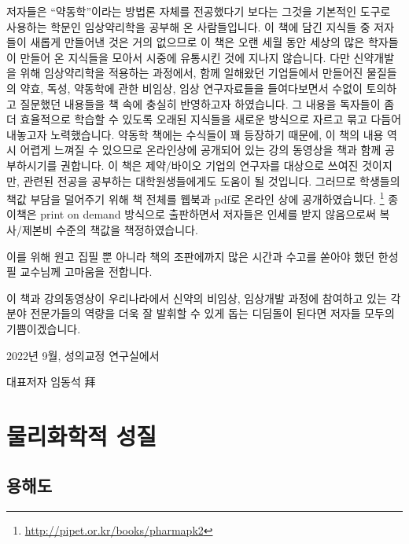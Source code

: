 \documentclass[
  11pt,
  krantz2, a4paper, twoside]{krantz}
\begin{document}
저자들은 ``약동학''이라는 방법론 자체를 전공했다기 보다는 그것을 기본적인
도구로 사용하는 학문인 임상약리학을 공부해 온 사람들입니다. 이 책에 담긴
지식들 중 저자들이 새롭게 만들어낸 것은 거의 없으므로 이 책은 오랜 세월
동안 세상의 많은 학자들이 만들어 온 지식들을 모아서 시중에 유통시킨 것에
지나지 않습니다. 다만 신약개발을 위해 임상약리학을 적용하는 과정에서,
함께 일해왔던 기업들에서 만들어진 물질들의 약효, 독성, 약동학에 관한
비임상, 임상 연구자료들을 들여다보면서 수없이 토의하고 질문했던 내용들을
책 속에 충실히 반영하고자 하였습니다. 그 내용을 독자들이 좀 더
효율적으로 학습할 수 있도록 오래된 지식들을 새로운 방식으로 자르고 묶고
다듬어 내놓고자 노력했습니다. 약동학 책에는 수식들이 꽤 등장하기 때문에, 이 책의 내용 역시 어렵게 느껴질 수 있으므로 온라인상에 공개되어 있는 강의 동영상을 책과 함께 공부하시기를 권합니다.
이 책은 제약/바이오 기업의 연구자를 대상으로 쓰여진 것이지만, 관련된 전공을 공부하는 대학원생들에게도 도움이 될 것입니다.
그러므로 학생들의 책값 부담을 덜어주기 위해 책 전체를 웹북과 pdf로 온라인 상에 공개하였습니다. \footnote{\url{http://pipet.or.kr/books/pharmapk2}}
종이책은 print on demand 방식으로 출판하면서 저자들은 인세를 받지 않음으로써 복사/제본비 수준의 책값을 책정하였습니다.

이를 위해 원고 집필 뿐 아니라 책의 조판에까지 많은 시간과 수고를 쏟아야 했던 한성필 교수님께 고마움을 전합니다.

이 책과 강의동영상이 우리나라에서 신약의 비임상, 임상개발 과정에 참여하고 있는 각 분야 전문가들의 역량을 더욱 잘 발휘할 수 있게 돕는 디딤돌이 된다면 저자들 모두의 기쁨이겠습니다.

\hfill 2022년 9월, 성의교정 연구실에서

\hfill 대표저자 임동석 拜

\normalsize

\mainmatter

\hypertarget{part-uxbb3cuxb9acuxd654uxd559uxc801-uxc131uxc9c8}{%
\part{물리화학적 성질}\label{part-uxbb3cuxb9acuxd654uxd559uxc801-uxc131uxc9c8}}

\hypertarget{uxc6a9uxd574uxb3c4}{%
\chapter{용해도}\label{uxc6a9uxd574uxb3c4}}

\Large\hfill
\end{document}
